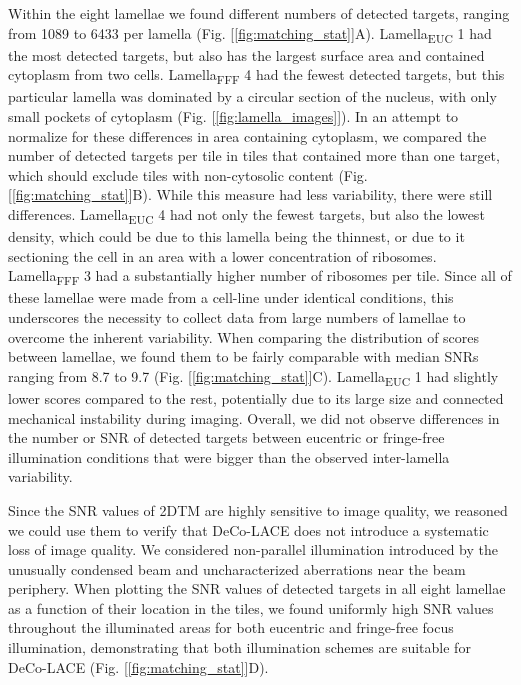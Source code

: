 \documentclass[
]{article}
\begin{document}
Within the eight lamellae we found different numbers of detected
targets, ranging from 1089 to 6433 per lamella (Fig.
{[}\ref{fig:matching_stat}{]}A). Lamella\textsubscript{EUC} 1 had the most detected targets,
but also has the largest surface area and contained cytoplasm from two
cells. Lamella\textsubscript{FFF} 4 had the fewest detected targets, but this
particular lamella was dominated by a circular section of the nucleus,
with only small pockets of cytoplasm (Fig. {[}\ref{fig:lamella_images}{]}). In an
attempt to normalize for these differences in area containing cytoplasm,
we compared the number of detected targets per tile in tiles that
contained more than one target, which should exclude tiles with
non-cytosolic content (Fig. {[}\ref{fig:matching_stat}{]}B). While this measure
had less variability, there were still differences. Lamella\textsubscript{EUC} 4 had
not only the fewest targets, but also the lowest density, which could be
due to this lamella being the thinnest, or due to it sectioning the cell
in an area with a lower concentration of ribosomes. Lamella\textsubscript{FFF} 3 had a
substantially higher number of ribosomes per tile. Since all of these
lamellae were made from a cell-line under identical conditions, this
underscores the necessity to collect data from large numbers of lamellae
to overcome the inherent variability. When comparing the distribution of
scores between lamellae, we found them to be fairly comparable with
median SNRs ranging from 8.7 to 9.7 (Fig. {[}\ref{fig:matching_stat}{]}C).
Lamella\textsubscript{EUC} 1 had slightly lower scores compared to the rest,
potentially due to its large size and connected mechanical instability
during imaging. Overall, we did not observe differences in the number or
SNR of detected targets between eucentric or fringe-free illumination
conditions that were bigger than the observed inter-lamella variability.

Since the SNR values of 2DTM are highly sensitive to image quality, we
reasoned we could use them to verify that DeCo-LACE does not introduce a
systematic loss of image quality. We considered non-parallel
illumination introduced by the unusually condensed beam and
uncharacterized aberrations near the beam periphery. When plotting the
SNR values of detected targets in all eight lamellae as a function of
their location in the tiles, we found uniformly high SNR values
throughout the illuminated areas for both eucentric and fringe-free
focus illumination, demonstrating that both illumination schemes are
suitable for DeCo-LACE (Fig. {[}\ref{fig:matching_stat}{]}D).
\end{document}

